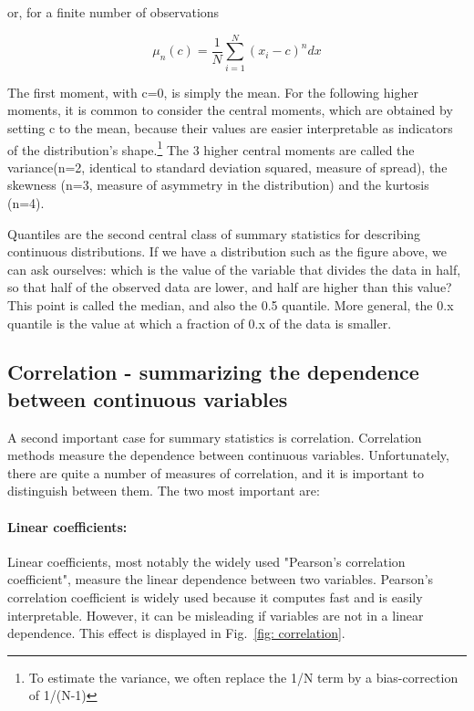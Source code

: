 \documentclass[a4paper,twoside]{tufte-book}\usepackage[]{graphicx}\usepackage[]{color}
\begin{document}
or, for a finite number of observations 

\begin{equation}
\mu_n(c) = \frac{1}{N}\sum_{i=1}^N (x_i - c)^n dx
\end{equation}

The first moment, with c=0, is simply the mean. For the following higher moments, it is common to consider the central moments, which are obtained by setting c to the mean, because their values are easier interpretable as indicators of the distribution's shape.\footnote{To estimate the variance, we often replace the 1/N term by a bias-correction of 1/(N-1)} The 3 higher central moments are called the variance(n=2, identical to standard deviation squared, measure of spread), the skewness (n=3, measure of asymmetry in the distribution) and the kurtosis (n=4). 

Quantiles are the second central class of summary statistics for describing continuous distributions. If we have a distribution such as the figure above, we can ask ourselves: which is the value of the variable that divides the data in half, so that half of the observed data are lower, and half are higher than this value? This point is called the median, and also the 0.5 quantile. More general, the 0.x quantile is the value at which a fraction of 0.x of the data is smaller. 

\subsection{Correlation - summarizing the dependence between continuous variables}

A second important case for summary statistics is correlation. Correlation methods measure the dependence between continuous variables. Unfortunately, there are quite a number of measures of correlation, and it is important to distinguish between them. The two most important are:

\paragraph{Linear coefficients:}Linear coefficients, most notably the widely used "Pearson's correlation coefficient", measure the linear dependence between two variables. Pearson's correlation coefficient is widely used because it computes fast and is easily interpretable. However, it can be misleading if variables are not in a linear dependence. This effect is displayed in Fig.~\ref{fig: correlation}.
\end{document}
